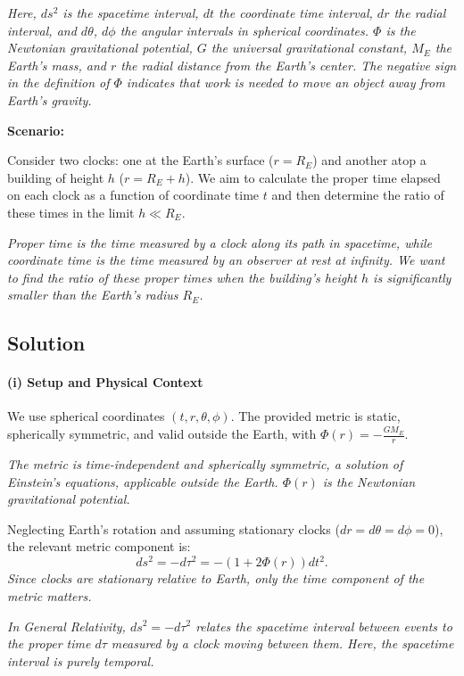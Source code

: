 \textit{Here, $ds^2$ is the spacetime interval, $dt$ the coordinate time interval, $dr$ the radial interval, and $d\theta$, $d\phi$ the angular intervals in spherical coordinates. $\Phi$ is the Newtonian gravitational potential, $G$ the universal gravitational constant, $M_E$ the Earth's mass, and $r$ the radial distance from the Earth's center. The negative sign in the definition of $\Phi$ indicates that work is needed to move an object away from Earth's gravity.}

\textbf{Scenario:}

Consider two clocks: one at the Earth's surface ($r = R_E$) and another atop a building of height $h$ ($r = R_E + h$). We aim to calculate the proper time elapsed on each clock as a function of coordinate time $t$ and then determine the ratio of these times in the limit $h \ll R_E$.

\textit{Proper time is the time measured by a clock along its path in spacetime, while coordinate time is the time measured by an observer at rest at infinity. We want to find the ratio of these proper times when the building's height $h$ is significantly smaller than the Earth's radius $R_E$.}

\subsection*{Solution}

\paragraph{(i) Setup and Physical Context}

We use spherical coordinates $(t, r, \theta, \phi)$. The provided metric is static, spherically symmetric, and valid outside the Earth, with $\Phi(r) = -\frac{GM_E}{r}$.

\textit{The metric is time-independent and spherically symmetric, a solution of Einstein's equations, applicable outside the Earth. $\Phi(r)$ is the Newtonian gravitational potential.}

Neglecting Earth's rotation and assuming stationary clocks ($dr = d\theta = d\phi = 0$), the relevant metric component is:
\[
ds^2 = -d\tau^2 = -\left(1 + 2\Phi(r)\right)dt^2.
\]
\textit{Since clocks are stationary relative to Earth, only the time component of the metric matters.}

\textit{In General Relativity, $ds^2 = -d\tau^2$ relates the spacetime interval between events to the proper time $d\tau$ measured by a clock moving between them. Here, the spacetime interval is purely temporal.}


